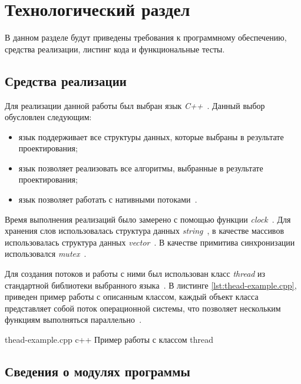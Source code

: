 \chapter{Технологический раздел}

В данном разделе будут приведены требования к программному обеспечению, средства реализации, листинг кода и функциональные тесты.


\section{Средства реализации}

Для реализации данной работы был выбран язык \textit{C++}~\cite{cpp}.
Данный выбор обусловлен следующим:
\begin{itemize}
	\item язык поддерживает все структуры данных, которые выбраны в результате проектирования;
	\item язык позволяет реализовать все алгоритмы, выбранные в результате проектирования;
	\item язык позволяет работать с нативными потоками~\cite{thread}. 
\end{itemize}

Время выполнения реализаций было замерено с помощью функции \textit{clock}~\cite{clock}. 
Для хранения слов использовалась структура данных \textit{string}~\cite{wstring}, в качестве массивов использовалась структура данных \textit{vector}~\cite{vector}.
В качестве примитива синхронизации использовался \textit{mutex}~\cite{mutex}.

Для создания потоков и работы с ними был использован класс \textit{thread} из стандартной библиотеки выбранного языка~\cite{thread}.
В листинге \ref{lst:thead-example.cpp}, приведен пример работы с описанным классом, каждый объект класса представляет собой поток операционной системы, что позволяет нескольким функциям выполняться параллельно~\cite{thread}. 

\clearpage
{}
{thead-example.cpp} %
{c++} %
{Пример работы с классом thread} %



\section{Сведения о модулях программы}

